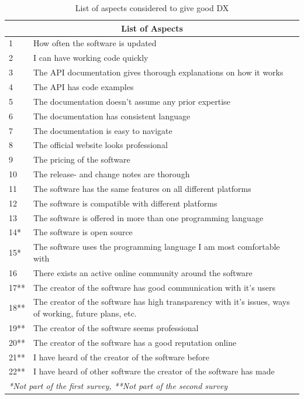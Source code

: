 \documentclass{cslthse-msc}
\begin{document}
    \begin{table}[H]
        \centering
        \begin{tabularx}{\columnwidth}{l X}
            \multicolumn{2}{c}{\textbf{List of Aspects}} \\
            \hline
            1    & How often the software is updated    \\
            2    & I can have working code quickly  \\
            3    & The API documentation gives thorough explanations on how it works    \\
            4    & The API has code examples    \\
            5    & The documentation doesn't assume any prior expertise \\
            6    & The documentation has consistent language    \\
            7    & The documentation is easy to navigate    \\
            8    & The official website looks professional  \\
            9    & The pricing of the software  \\
            10    &  The release- and change notes are thorough \\
            11   &  The software has the same features on all different platforms   \\
            12    &  The software is compatible with different platforms    \\
            13  &  The software is offered in more than one programming language    \\
            14*    &  The software is open source    \\
            15*    &  The software uses the programming language I am most comfortable with  \\
            16    &  There exists an active online community around the software    \\
            \hline \hline
            17** & The creator of the software has good communication with it's users \\
            18** & The creator of the software has high transparency with it's issues, ways of working, future plans, etc. \\
            19** & The creator of the software seems professional \\
            20** & The creator of the software has a good reputation online \\
            21** & I have heard of the creator of the software before \\
            22** & I have heard of other software the creator of the software has made
            & \\
            \multicolumn{2}{l}{\textit{*Not part of the first survey, **Not part of the second survey}}
        \end{tabularx}
        \caption{List of aspects considered to give good DX}
        \label{tab:aspects}
    \end{table}
\end{document}
